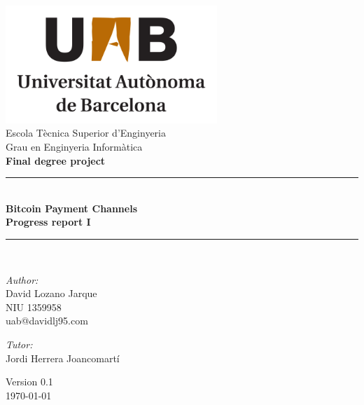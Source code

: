 \documentclass[a4paper,12pt,openany]{report}
\begin{document}

\begin{titlepage}
\begin{center}

\includegraphics[width=0.6\textwidth]{uab_logo.png}\\[1cm]

{\large Escola Tècnica Superior d'Enginyeria}\\[0.5cm]

{\large Grau en Enginyeria Informàtica}\\[0.5cm]

{\large \textbf{Final degree project}}\\[0.5cm]

\rule{\linewidth}{0.5mm} \\[0.4cm]
{ \huge \bfseries Bitcoin Payment Channels \\[0.4cm] }
{ \large \bfseries Progress report I}
\rule{\linewidth}{0.5mm} \\[1.5cm]

\noindent
\begin{minipage}{0.4\textwidth}
  \begin{flushleft} \large
    \emph{Author:}\\
    David Lozano Jarque\\
    NIU 1359958\\
    uab@davidlj95.com
  \end{flushleft}
\end{minipage}%
\begin{minipage}{0.4\textwidth}
  \begin{flushright} \large
    \emph{Tutor:} \\
    Jordi Herrera Joancomartí\\
  \end{flushright}
\end{minipage}

\vfill

{\large Version 0.1\\ \today}

\end{center}
\end{titlepage}
\end{document}

